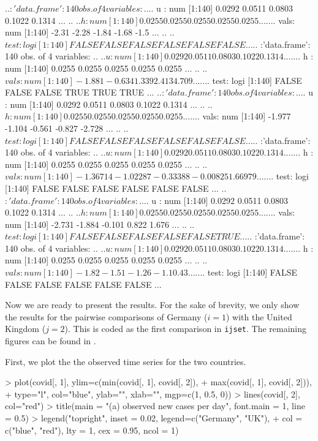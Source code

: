 \documentclass[a4paper]{scrartcl}
\begin{document}
\begin{Schunk}
\begin{Soutput}
  ..$ :'data.frame':	140 obs. of  4 variables:
  .. ..$ u   : num [1:140] 0.0292 0.0511 0.0803 0.1022 0.1314 ...
  .. ..$ h   : num [1:140] 0.0255 0.0255 0.0255 0.0255 0.0255 ...
  .. ..$ vals: num [1:140] -2.31 -2.28 -1.84 -1.68 -1.5 ...
  .. ..$ test: logi [1:140] FALSE FALSE FALSE FALSE FALSE FALSE ...
  ..$ :'data.frame':	140 obs. of  4 variables:
  .. ..$ u   : num [1:140] 0.0292 0.0511 0.0803 0.1022 0.1314 ...
  .. ..$ h   : num [1:140] 0.0255 0.0255 0.0255 0.0255 0.0255 ...
  .. ..$ vals: num [1:140] -1.881 -0.634 1.339 2.413 4.709 ...
  .. ..$ test: logi [1:140] FALSE FALSE FALSE TRUE TRUE TRUE ...
  ..$ :'data.frame':	140 obs. of  4 variables:
  .. ..$ u   : num [1:140] 0.0292 0.0511 0.0803 0.1022 0.1314 ...
  .. ..$ h   : num [1:140] 0.0255 0.0255 0.0255 0.0255 0.0255 ...
  .. ..$ vals: num [1:140] -1.977 -1.104 -0.561 -0.827 -2.728 ...
  .. ..$ test: logi [1:140] FALSE FALSE FALSE FALSE FALSE FALSE ...
  ..$ :'data.frame':	140 obs. of  4 variables:
  .. ..$ u   : num [1:140] 0.0292 0.0511 0.0803 0.1022 0.1314 ...
  .. ..$ h   : num [1:140] 0.0255 0.0255 0.0255 0.0255 0.0255 ...
  .. ..$ vals: num [1:140] -1.36714 -1.02287 -0.33388 -0.00825 1.66979 ...
  .. ..$ test: logi [1:140] FALSE FALSE FALSE FALSE FALSE FALSE ...
  ..$ :'data.frame':	140 obs. of  4 variables:
  .. ..$ u   : num [1:140] 0.0292 0.0511 0.0803 0.1022 0.1314 ...
  .. ..$ h   : num [1:140] 0.0255 0.0255 0.0255 0.0255 0.0255 ...
  .. ..$ vals: num [1:140] -2.731 -1.884 -0.101 0.822 1.676 ...
  .. ..$ test: logi [1:140] FALSE FALSE FALSE FALSE FALSE TRUE ...
  ..$ :'data.frame':	140 obs. of  4 variables:
  .. ..$ u   : num [1:140] 0.0292 0.0511 0.0803 0.1022 0.1314 ...
  .. ..$ h   : num [1:140] 0.0255 0.0255 0.0255 0.0255 0.0255 ...
  .. ..$ vals: num [1:140] -1.82 -1.51 -1.26 -1.1 0.43 ...
  .. ..$ test: logi [1:140] FALSE FALSE FALSE FALSE FALSE FALSE ...
\end{Soutput}
\end{Schunk}

Now we are ready to present the results. For the sake of brevity, we only show the results for the pairwise comparisons of Germany ($i = 1$) with the United Kingdom ($j = 2$). This is coded as the first comparison in \verb|ijset|. The remaining figures can be found in \cite{KhismatullinaVogt2020b}.

First, we plot the the observed time series for the two countries.

\begin{Schunk}
\begin{Sinput}
> plot(covid[, 1], ylim=c(min(covid[, 1], covid[, 2]),
+                         max(covid[, 1], covid[, 2])),
+      type="l", col="blue", ylab="", xlab="", mgp=c(1, 0.5, 0))
> lines(covid[, 2], col="red")
> title(main = "(a) observed new cases per day", font.main = 1, line = 0.5)
> legend("topright", inset = 0.02, legend=c("Germany", "UK"),
+        col = c("blue", "red"), lty = 1, cex = 0.95, ncol = 1)
\end{Sinput}
\end{Schunk}
\end{document}
